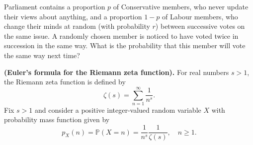 \documentclass[answers]{exam}
\begin{document}
\begin{questions}



\question%
Parliament contains a proportion $p$ of Conservative members, who never update their views about anything, and a proportion $1-p$ of Labour members, who change their minds at random (with probability $r$) between successive votes on the same issue. A randomly chosen member is noticed to have voted twice in succession in the same way. What is the probability that this member will vote the same way next time?



\question%



\question%
\textbf{(Euler's formula for the Riemann zeta function).} For real numbers $s>1$, the Riemann zeta function is defined by \[
	\zeta(s)=\sum_{n=1}^{\infty} \frac{1}{n^{s}}.
\] Fix $s>1$ and consider a positive integer-valued random variable $X$ with probability mass function given by \[
	p_{X}(n)=\mathbb{P}(X=n)=\frac{1}{n^{s}} \frac{1}{\zeta(s)}, \quad n \geq 1.
\]
\begin{parts}

\end{parts}
\end{questions}
\end{document}
